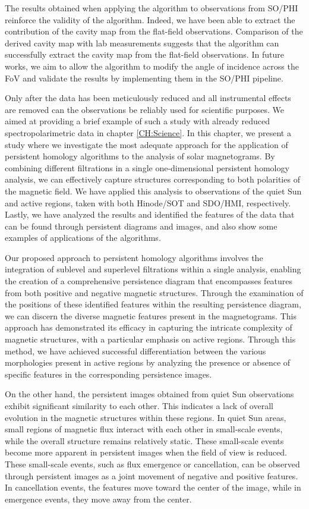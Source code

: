The results obtained when applying the algorithm to observations from SO/PHI reinforce the validity of the algorithm. Indeed, we have been able to extract the contribution of the cavity map from the flat-field observations. Comparison of the derived cavity map with lab measurements suggests that the algorithm can successfully extract the cavity map from the flat-field observations. In future works, we aim to allow the algorithm to modify the angle of incidence across the FoV and validate the results by implementing them in the SO/PHI pipeline.

Only after the data has been meticulously reduced and all instrumental effects are removed can the observations be reliably used for scientific purposes. We aimed at providing a brief example of such a study with already reduced spectropolarimetric data in chapter \ref{CH:Science}. In this chapter, we present a study where we investigate the most adequate approach for the application of persistent homology algorithms to the analysis of solar magnetograms. By combining different filtrations in a single one-dimensional persistent homology analysis, we can effectively capture structures corresponding to both polarities of the magnetic field. We have applied this analysis to observations of the quiet Sun and active regions, taken with both Hinode/SOT and SDO/HMI, respectively. Lastly, we have analyzed the results and identified the features of the data that can be found through persistent diagrams and images, and also show some examples of applications of the algorithms. 

Our proposed approach to persistent homology algorithms involves the integration of sublevel and superlevel filtrations within a single analysis, enabling the creation of a comprehensive persistence diagram that encompasses features from both positive and negative magnetic structures. Through the examination of the positions of these identified features within the resulting persistence diagram, we can discern the diverse magnetic features present in the magnetograms. This approach has demonstrated its efficacy in capturing the intricate complexity of magnetic structures, with a particular emphasis on active regions. Through this method, we have achieved successful differentiation between the various morphologies present in active regions by analyzing the presence or absence of specific features in the corresponding persistence images. 

On the other hand, the persistent images obtained from quiet Sun observations exhibit significant similarity to each other. This indicates a lack of overall evolution in the magnetic structures within these regions. In quiet Sun areas, small regions of magnetic flux interact with each other in small-scale events, while the overall structure remains relatively static. These small-scale events become more apparent in persistent images when the field of view is reduced. These small-scale events, such as flux emergence or cancellation, can be observed through persistent images as a joint movement of negative and positive features. In cancellation events, the features move toward the center of the image, while in emergence events, they move away from the center.

